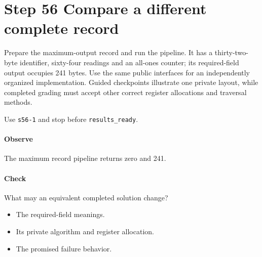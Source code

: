 \section{Step 56 Compare a different complete record}\label{cbor-s56}
Prepare the maximum-output record and run the pipeline. It has a thirty-two-byte identifier, sixty-four readings and an all-ones counter; its required-field output occupies 241 bytes. Use the same public interfaces for an independently organized implementation. Guided checkpoints illustrate one private layout, while completed grading must accept other correct register allocations and traversal methods.

Use \texttt{s56-1} and stop before \texttt{results\_ready}.

\paragraph{Observe} The maximum record pipeline returns zero and 241.

\paragraph{Check} What may an equivalent completed solution change?
\begin{itemize}
\item[A.] The required-field meanings.
\item[B.] Its private algorithm and register allocation.
\item[C.] The promised failure behavior.
\end{itemize}
